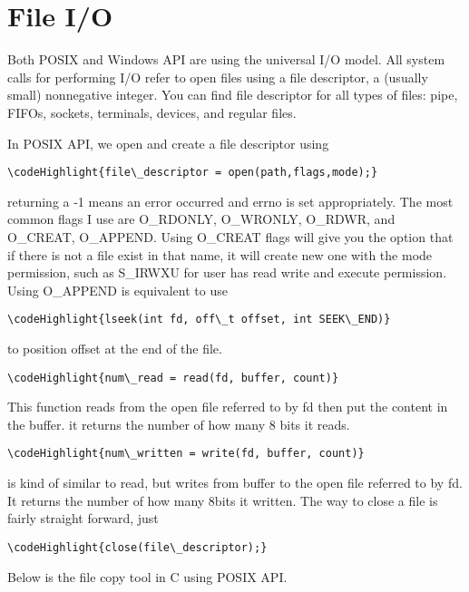 \documentclass[10pt,draftclsnofoot,onecolumn,journal,compsoc]{IEEEtran}
\newcommand\codeHighlight[1]{\textcolor[rgb]{1,0,0}{\textbf{#1}}}
\begin{document}
\section*{File I/O}
Both POSIX and Windows API are using the universal I/O model. All system calls for performing I/O refer to open files using a file descriptor, a (usually small) nonnegative integer. You can find file descriptor for all types of files: pipe, FIFOs, sockets, terminals, devices, and regular files.\par
In POSIX API, we open and create a file descriptor using
\begin{Verbatim}[commandchars=\\\{\}]
\codeHighlight{file\_descriptor = open(path,flags,mode);}
\end{Verbatim}
returning a -1 means an error occurred and errno is set appropriately. The most common flags I use are O\_RDONLY, O\_WRONLY, O\_RDWR, and O\_CREAT, O\_APPEND. Using O\_CREAT flags will give you the option that if there is not a file exist in that name, it will create new one with the mode permission, such as S\_IRWXU for user has read write and execute permission. Using O\_APPEND is equivalent to use 
\begin{Verbatim}[commandchars=\\\{\}]
\codeHighlight{lseek(int fd, off\_t offset, int SEEK\_END)}
\end{Verbatim}
to position offset at the end of the file. 
\begin{Verbatim}[commandchars=\\\{\}]
\codeHighlight{num\_read = read(fd, buffer, count)}
\end{Verbatim}
This function reads from the open file referred to by fd then put the content in the buffer. it returns the number of how many 8 bits it reads.
\begin{Verbatim}[commandchars=\\\{\}]
\codeHighlight{num\_written = write(fd, buffer, count)}
\end{Verbatim} 
is kind of similar to read, but writes from buffer to the open file referred to by fd. It returns the number of how many 8bits it written. The way to close a file is fairly straight forward, just 
\begin{Verbatim}[commandchars=\\\{\}]
\codeHighlight{close(file\_descriptor);}
\end{Verbatim}
\par
Below is the file copy tool in C using POSIX API.\\
\end{document}
